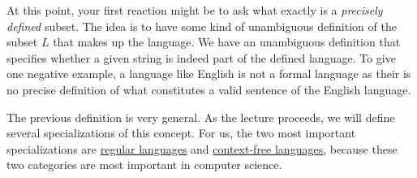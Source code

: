 At this point, your first reaction might be to ask what exactly is a \emph{precisely defined} subset.  The idea
is to have some kind of unambiguous definition of the subset $L$ that makes up the language.  We have an
unambiguous definition that specifies whether a given string is indeed part of the defined language.  To give
one negative example, a language like English is not a formal language as their is no precise definition of
what constitutes a valid sentence of the English language.

The previous definition is very general.  As the lecture proceeds, we will define several
specializations of this concept.  For us, the two most important specializations are 
\href{http://en.wikipedia.org/wiki/Regular_language}{regular languages}  and
\href{http://en.wikipedia.org/wiki/Context-free_language}{context-free languages}, 
because these two categories are most important in computer science. 

